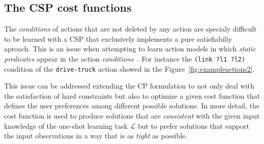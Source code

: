 \documentclass{ecai}
\begin{document}


\subsection{The CSP cost functions}
The {\em conditions} of actions that are not deleted by any action are specialy difficult to be learned with a CSP that exclusively implements a pure satisfiabiliy aproach. This is an issue when attempting to learn action models in which {\em static predicates} appear in the action {\em conditions}~\cite{gregory2015domain}. For instance the {\tt (link ?l1 ?l2)} condition of the {\tt drive-truck} action showed in the Figure~\ref{fig:exampleactions2}.

This issue can be addressed extending the CP formulation to not only deal with the satisfaction of hard constraints but also to optimize a given cost function that defines the user preferences among different possible solutions. In more detail, the cost function is used to produce solutions that are {\em consistent} with the given input knowledge of the one-shot learning task $\mathcal{L}$ but to prefer solutions that support the input observations in a way that is as {\em tight} as possible.
\end{document}
